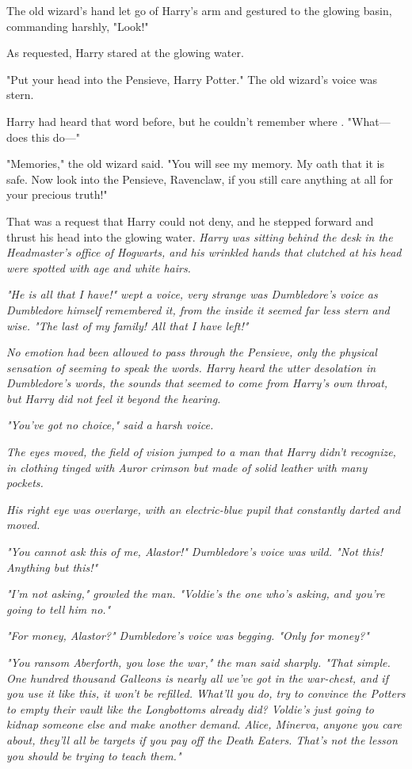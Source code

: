 The old wizard's hand let go of Harry's arm and gestured to the glowing basin, 
commanding harshly, "Look!"

As requested, Harry stared at the glowing water.

"Put your head into the Pensieve, Harry Potter." The old wizard's voice was 
stern.

Harry had heard that word before, but he couldn't remember where . "What---does 
this do---"

"Memories," the old wizard said. "You will see my memory. My oath that it is 
safe. Now look into the Pensieve, Ravenclaw, if you still care anything at all 
for your precious truth!"

That was a request that Harry could not deny, and he stepped forward and thrust 
his head into the glowing water.
\sbreak
\emph{Harry was sitting behind the desk in the Headmaster's office of Hogwarts, 
and his wrinkled hands that clutched at his head were spotted with age and 
white hairs.}

\emph{"He is all that I have!" wept a voice, very strange was Dumbledore's 
voice as Dumbledore himself remembered it, from the inside it seemed far less 
stern and wise. "The last of my family! All that I have left!"}

\emph{No emotion had been allowed to pass through the Pensieve, only the 
physical sensation of seeming to speak the words. Harry heard the utter 
desolation in Dumbledore's words, the sounds that seemed to come from Harry's 
own throat, but Harry did not feel it beyond the hearing.}

\emph{"You've got no choice," said a harsh voice.}

\emph{The eyes moved, the field of vision jumped to a man that Harry didn't 
recognize, in clothing tinged with Auror crimson but made of solid leather with 
many pockets.}

\emph{His right eye was overlarge, with an electric-blue pupil that constantly 
darted and moved.}

\emph{"You cannot ask this of me, Alastor!" Dumbledore's voice was wild. "Not 
this! Anything but this!"}

\emph{"I'm not asking," growled the man. "Voldie's the one who's asking, and 
you're going to tell him no."}

\emph{"For money, Alastor?" Dumbledore's voice was begging. "Only for money?"}

\emph{"You ransom Aberforth, you lose the war," the man said sharply. "That 
simple. One hundred thousand Galleons is nearly all we've got in the war-chest, 
and if you use it like this, it won't be refilled. What'll you do, try to 
convince the Potters to empty their vault like the Longbottoms already did? 
Voldie's just going to kidnap someone else and make another demand. Alice, 
Minerva, anyone you care about, they'll all be targets if you pay off the Death 
Eaters. That's not the lesson you should be trying to teach them."}

